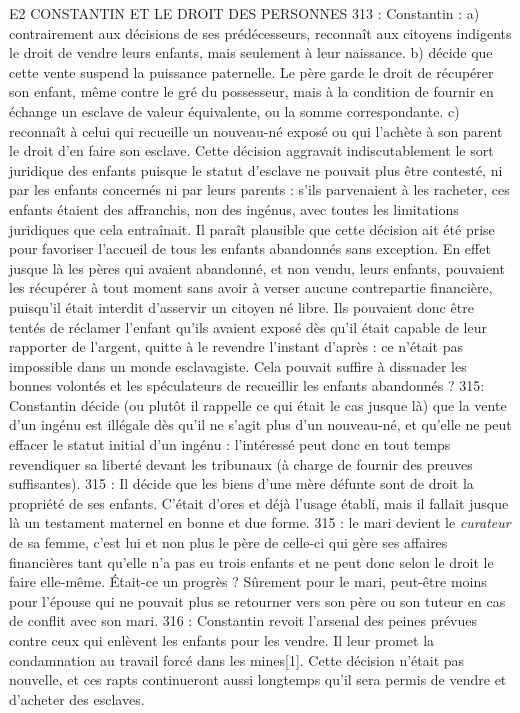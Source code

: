E2 CONSTANTIN ET LE DROIT DES PERSONNES
 313 : Constantin : a) contrairement aux décisions de ses prédécesseurs, reconnaît aux citoyens indigents le droit de vendre leurs enfants, mais seulement à leur naissance. 
 b) décide que cette vente suspend la puissance paternelle. Le père garde le droit de récupérer son enfant, même contre le gré du possesseur, mais à la condition de fournir en échange un esclave de valeur équivalente, ou la somme correspondante. 
 c) reconnaît à celui qui recueille un nouveau-né exposé ou qui l'achète à son parent le droit d'en faire son esclave. Cette décision aggravait indiscutablement le sort juridique des enfants puisque le statut d'esclave ne pouvait plus être contesté, ni par les enfants concernés ni par leurs parents : s'ils parvenaient à les racheter, ces enfants étaient des affranchis, non des ingénus, avec toutes les limitations juridiques que cela entraînait. Il paraît plausible que cette décision ait été prise pour favoriser l'accueil de tous les enfants abandonnés sans exception. En effet jusque là les pères qui avaient abandonné, et non vendu, leurs enfants, pouvaient les récupérer à tout moment sans avoir à verser aucune contrepartie financière, puisqu'il était interdit d'asservir un citoyen né libre. Ils pouvaient donc être tentés de réclamer l'enfant qu'ils avaient exposé dès qu'il était capable de leur rapporter de l'argent, quitte à le revendre l'instant d'après : ce n'était pas impossible dans un monde esclavagiste. Cela pouvait suffire à dissuader les bonnes volontés et les spéculateurs de recueillir les enfants abandonnés ? 
 315: Constantin décide (ou plutôt il rappelle ce qui était le cas jusque là) que la vente d'un ingénu est illégale dès qu'il ne s'agit plus d'un nouveau-né, et qu'elle ne peut effacer le statut initial d'un ingénu : l'intéressé peut donc en tout temps revendiquer sa liberté devant les tribunaux (à charge de fournir des preuves suffisantes).
 315 : Il décide que les biens d'une mère défunte sont de droit la propriété de ses enfants. C'était d'ores et déjà l'usage établi, mais il fallait jusque là un testament maternel en bonne et due forme.
 315 : le mari devient le \emph{curateur} de sa femme, c'est lui et non plus le père de celle-ci qui gère ses affaires financières tant qu'elle n'a pas eu trois enfants et ne peut donc selon le droit le faire elle-même. Était-ce un progrès ? Sûrement pour le mari, peut-être moins pour l'épouse qui ne pouvait plus se retourner vers son père ou son tuteur en cas de conflit avec son mari.
 316 : Constantin revoit l'arsenal des peines prévues contre ceux qui enlèvent les enfants pour les vendre. Il leur promet la condamnation au travail forcé dans les mines[1]. Cette décision n'était pas nouvelle, et ces rapts continueront aussi longtemps qu'il sera permis de vendre et d'acheter des esclaves.
